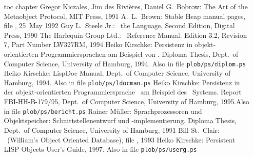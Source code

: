 %
\cleardoublepage
%
\newcommand{\etal}{et al.\ }
\newcommand{\infile}[1]{Also in file \texttt{#1}}
%
\begin{thebibliography}{XXXXXXXXXXXX}
\addcontentsline%
 {toc}%
 {chapter}%
 {\protect\numberline{}{\protect\bibname}}%
%
Gregor Kiczales, Jim des Rivi\`{e}res, Daniel G.\ Bobrow:
The Art of the Metaobject Protocol,
MIT Press, 1991
%
A.\ L.\ Brown:
Stable Heap manual pages,
file ,
25~May 1992
%
Guy L.\ Steele Jr.:
\cl\ the Language, Second Edition,
Digital Press, 1990
%
The Harlequin Group Ltd.:
\lw\ Reference Manual.
Edition 3.2, Revision 7, Part Number LW327RM,
1994
%
Heiko Kirschke:
Persistenz in objekt-orientierten Programmiersprachen am Beispiel von
\clos.
Diploma Thesis,
Dept.\ of Computer Science, University of Hamburg,
1994. \infile{plob/\lb{}ps/\lb{}diplom.ps}
%
Heiko Kirschke:
LispDoc Manual,
Dept.\ of Computer Science, University of Hamburg,
1994. \infile{plob/\lb{}ps/\lb{}ldocman.ps}
%
Heiko Kirschke:
Persistenz in der objekt-orientierten
Programmiersprache \clos\ am Beispiel
des \plob\ Systems.
Report FBI-HH-B-179/95,
Dept.\ of Computer Science, University of Hamburg,
1995.\infile{plob/\lb{}ps/\lb{}bericht.ps}
%
Rainer M\"{u}ller:
Sprachprozessoren und Objektspeicher:
Schnittstellenentwurf und -implementierung.
Diploma Thesis,
Dept.\ of Computer Science, University of Hamburg,
1991
%
Bill St.\ Clair:
\wood\ (William's Object Oriented Database),
file , 1993
%
Heiko Kirschke:
Persistent LISP Objects User's Guide,
1997. \infile{plob/\lb{}ps/\lb{}userg.ps}
%
\end{thebibliography}
%
